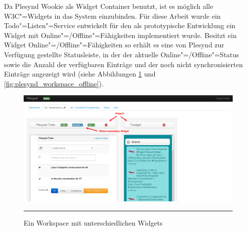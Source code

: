 Da Plesynd Wookie als Widget Container benutzt, ist es möglich alle W3C"=Widgets in das System einzubinden. Für diese Arbeit wurde ein Todo"=Listen"=Service entwickelt für den als prototypische Entwicklung ein Widget mit Online"=/Offline"=Fähigkeiten implementiert wurde. Besitzt ein Widget Online"=/Offline"=Fähigkeiten so erhält es eine von Plesynd zur Verfügung gestellte Statusleiste, in der der aktuelle Online"=/Offline"=Status sowie die Anzahl der verfügbaren Einträge und der noch nicht synchronisierten Einträge angezeigt wird (siehe Abbildungen \ref{fig:plesynd_workspace_online} und \ref{fig:plesynd_workspace_offline}).
\begin{figure}
  \centering
  \includegraphics[width=\textwidth,height=\textheight,keepaspectratio]{./Figures/plesynd_workspace_online.png}
    \rule{35em}{0.5pt}
  \caption[Plesynd User"=Interface: Workspace Online]{Ein Workspace mit unterschiedlichen Widgets}
  \label{fig:plesynd_workspace_online}
\end{figure}

